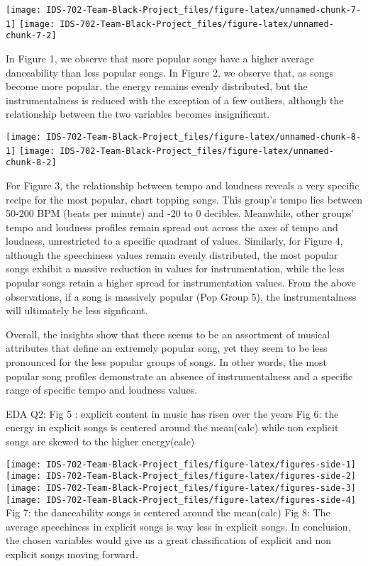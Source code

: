 \documentclass[
]{article}
\begin{document}
\texttt{[image: IDS-702-Team-Black-Project\_files/figure-latex/unnamed-chunk-7-1]}
\texttt{[image: IDS-702-Team-Black-Project\_files/figure-latex/unnamed-chunk-7-2]}

In Figure 1, we observe that more popular songs have a higher average
danceability than less popular songs. In Figure 2, we observe that, as
songs become more popular, the energy remains evenly distributed, but
the instrumentalness is reduced with the exception of a few outliers,
although the relationship between the two variables becomes
insignificant.

\texttt{[image: IDS-702-Team-Black-Project\_files/figure-latex/unnamed-chunk-8-1]}
\texttt{[image: IDS-702-Team-Black-Project\_files/figure-latex/unnamed-chunk-8-2]}

For Figure 3, the relationship between tempo and loudness reveals a very
specific recipe for the most popular, chart topping songs. This group's
tempo lies between 50-200 BPM (beats per minute) and -20 to 0 decibles.
Meanwhile, other groups' tempo and loudness profiles remain spread out
across the axes of tempo and loudness, unrestricted to a specific
quadrant of values. Similarly, for Figure 4, although the speechiness
values remain evenly distributed, the most popular songs exhibit a
massive reduction in values for instrumentation, while the less popular
songs retain a higher spread for instrumentation values. From the above
observations, if a song is massively popular (Pop Group 5), the
instrumentalness will ultimately be less signficant.

Overall, the insights show that there seems to be an assortment of
musical attributes that define an extremely popular song, yet they seem
to be less pronounced for the less popular groups of songs. In other
words, the most popular song profiles demonstrate an absence of
instrumentalness and a specific range of specific tempo and loudness
values.

EDA Q2: Fig 5 : explicit content in music has risen over the years Fig
6: the energy in explicit songs is centered around the mean(calc) while
non explicit songs are skewed to the higher energy(calc)

\texttt{[image: IDS-702-Team-Black-Project\_files/figure-latex/figures-side-1]}
\texttt{[image: IDS-702-Team-Black-Project\_files/figure-latex/figures-side-2]}
\texttt{[image: IDS-702-Team-Black-Project\_files/figure-latex/figures-side-3]}
\texttt{[image: IDS-702-Team-Black-Project\_files/figure-latex/figures-side-4]}
Fig 7: the danceability songs is centered around the mean(calc) Fig 8:
The average speechiness in explicit songs is way less in explicit songs.
In conclusion, the chosen variables would give us a great classification
of explicit and non explicit songs moving forward.
\end{document}
